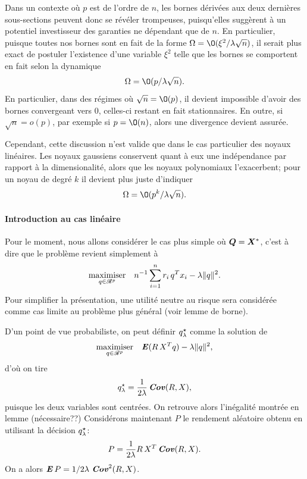 Dans un contexte où $p$ est de l'ordre de $n$, les bornes dérivées aux deux dernières
sous-sections peuvent donc se révéler trompeuses, puisqu'elles suggèrent à un potentiel
investisseur des garanties ne dépendant que de $n$. En particulier, puisque toutes nos
bornes sont en fait de la forme $\Omega = \O(\xi^2/\lambda\sqrt{n})$, il serait plus exact de postuler
l'existence d'une variable $\xi^2$ telle que les bornes se comportent en fait selon la
dynamique
\begin{equation}
  \Omega = \O(p/\lambda\sqrt{n}).
\end{equation}
En particulier, dans des régimes où $\sqrt{n}=\O(p)$, il devient impossible d'avoir des
bornes convergeant vers 0, celles-ci restant en fait stationnaires. En outre, si
$\sqrt{n}=o(p)$, par exemple si $p=\O(n)$, alors une divergence devient assurée.

Cependant, cette discussion n'est valide que dans le cas particulier des noyaux
linéaires. Les noyaux gaussiens conservent quant à eux une indépendance par rapport à la
dimensionalité, alors que les noyaux polynomiaux l'exacerbent; pour un noyau de degré $k$
il devient plus juste d'indiquer
\begin{equation}
  \Omega = \O(p^k/\lambda\sqrt{n}).
\end{equation}


\paragraph{Introduction au cas linéaire}

Pour le moment, nous allons considérer le cas plus simple où $\Q = \X^*$, c'est à dire que
le problème revient simplement à 
\begin{equation}
  \maximizeEquation[q \in \Re^p]{n^{-1}\sumi r_i\,q^Tx_i - \lambda\|q\|^2.}
\end{equation}
Pour simplifier la présentation, une utilité neutre au risque sera considérée comme cas
limite au problème plus général (voir lemme de borne\cit).

D'un point de vue probabiliste, on peut définir $\qsh$ comme la solution de
\begin{equation}
  \maximizeEquation[q \in \Re^p]{\E(R\,X^Tq) - \lambda\|q\|^2,}
\end{equation}
d'où on tire
\begin{equation}
  q^\star_\lambda = \frac{1}{2\lambda}\Cov(R,X),
\end{equation}
puisque les deux variables sont centrées. On retrouve alors l'inégalité montrée en lemme
\cit (nécessaire??)
Considérons maintenant $P$ le rendement aléatoire obtenu en utilisant la décision $\qsh$:
\begin{equation}
  P = \frac{1}{2\lambda}R\,X^T\Cov(R,X).
\end{equation}
On a alors $\E P = 1/2\lambda\,\Cov^2(R,X)$.

